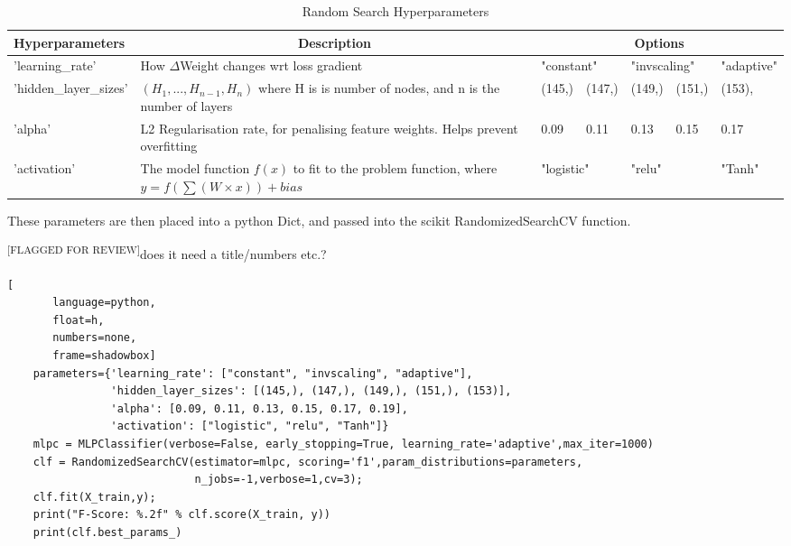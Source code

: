 \documentclass{UoNMCHA}
\newcommand{\flagforreview}{\textsuperscript{\color{red} [FLAGGED FOR REVIEW]}}
\numberwithin{equation}{section}
\begin{document}
\begin{table}[h]
    \begin{center}  
    \caption{Random Search Hyperparameters}\label{tab:RandCV_HyperOptions}
        \begin{tabular}{p{3cm}p{6.0cm}p{0.8cm}p{0.8cm}p{0.8cm}p{0.8cm}p{1.8cm}}%
            \hline\hline 
            Hyperparameters        & \multicolumn{1}{c}{Description}                                                            & \multicolumn{5}{c}{Options}                                \\
            \hline 
            'learning\_rate'       & How $\Delta$Weight changes wrt loss gradient                                               & \multicolumn{2}{l}{"constant"} & \multicolumn{2}{l}{"invscaling"} & "adaptive" \\ %
            'hidden\_layer\_sizes' & $(H_1, ..., H_{n-1}, H_n)$ where H is is number of nodes, and n is the number of layers    & (145,)     & (147,)       & (149,)     & (151,) & (153), \\
            'alpha'                & L2 Regularisation rate, for penalising feature weights. Helps prevent overfitting          & 0.09       & 0.11         & 0.13       & 0.15   & 0.17   \\
            'activation'           & The model function $f(x)$ to fit to the problem function,  where $y = f(\sum(W \times x)) + bias$                         & \multicolumn{2}{l}{"logistic"} & \multicolumn{2}{l}{"relu"}       & "Tanh"     \\%
            \hline 
        \end{tabular}
    \end{center}
\end{table}

These parameters are then placed into a python Dict, and passed into the scikit RandomizedSearchCV function.

\flagforreview does it need a title/numbers etc.?
\begin{lstlisting}[
       language=python,
       float=h,
       numbers=none,
       frame=shadowbox]
    parameters={'learning_rate': ["constant", "invscaling", "adaptive"],
                'hidden_layer_sizes': [(145,), (147,), (149,), (151,), (153)],
                'alpha': [0.09, 0.11, 0.13, 0.15, 0.17, 0.19],
                'activation': ["logistic", "relu", "Tanh"]}
    mlpc = MLPClassifier(verbose=False, early_stopping=True, learning_rate='adaptive',max_iter=1000)
    clf = RandomizedSearchCV(estimator=mlpc, scoring='f1',param_distributions=parameters,
                             n_jobs=-1,verbose=1,cv=3);
    clf.fit(X_train,y);    
    print("F-Score: %.2f" % clf.score(X_train, y))
    print(clf.best_params_)
\end{lstlisting}
\end{document}
